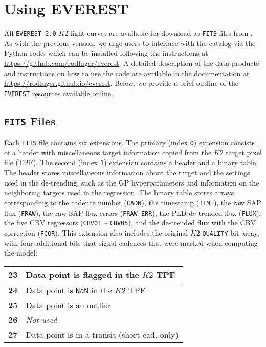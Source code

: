 \documentclass[]{aastex62}
\newcommand{\edited}[1]{{\color{red} #1}}
\begin{document}
\section{Using EVEREST}
\label{sec:using}
All \texttt{EVEREST 2.0} $K2$ light curves are available for download as \texttt{FITS} files
from . As with the
previous version, we urge users to interface with the catalog via the Python code,
which can be installed following the instructions at
\url{https://github.com/rodluger/everest}. \edited{A detailed description of the data products
and instructions on how to use the code are available in the documentation at
\url{https://rodluger.github.io/everest}.} Below, we provide
a brief outline of the \texttt{EVEREST} resources available online.

\subsection{\texttt{FITS} Files}
\label{sec:fits}
Each \texttt{FITS} file contains six extensions. The primary (index \texttt{0})
extension consists of a header with miscellaneous target information copied from
the $K2$ target pixel file (TPF). The second (index \texttt{1}) extension contains
a header and a binary table. The header stores miscellaneous
information about the target and the settings used in the de-trending, such as the
GP hyperparameters and information on the neighboring targets used in the regression.
The binary table stores arrays corresponding to the cadence number (\texttt{CADN}),
the timestamp (\texttt{TIME}), the raw SAP flux (\texttt{FRAW}), the raw SAP flux errors
(\texttt{FRAW\_ERR}), the PLD-de-trended flux (\texttt{FLUX}), the five CBV regressors
(\texttt{CBV01} -- \texttt{CBV05}), and the de-trended flux with the CBV
correction (\texttt{FCOR}). This extension also includes the
original $K2$ \texttt{QUALITY} bit array, with four additional bits that signal
cadences that were masked when computing the model:
%
\begin{center}
\begin{tabular}{ |l|l| }
  \hline
  \textbf{23} & Data point is flagged in the $K2$ TPF \\
  \hline
  \textbf{24} & Data point is \texttt{NaN} in the $K2$ TPF \\
  \hline
  \textbf{25} & Data point is an outlier \\
  \hline
  \textbf{26} & \emph{Not used} \\
  \hline
  \textbf{27} & Data point is in a transit (short cad. only) \\
  \hline
\end{tabular}
\end{center}
\end{document}
